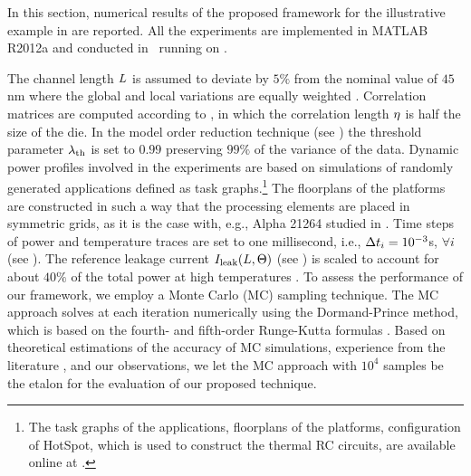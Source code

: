 In this section, numerical results of the proposed framework for the illustrative example in  are reported. All the experiments are implemented in MATLAB R2012a \cite{matlab} and conducted in \hostOS\ running on \hostHardware.

The channel length $L$ is assumed to deviate by $5\%$ from the nominal value of $45$ nm where the global and local variations are equally weighted \cite{juan2011, juan2012}. Correlation matrices are computed according to , in which the correlation length $\eta$ is half the size of the die. In the model order reduction technique (see ) the threshold parameter $\lambda_\text{th}$ is set to $0.99$ preserving $99\%$ of the variance of the data. Dynamic power profiles involved in the experiments are based on simulations of randomly generated applications defined as task graphs.\footnote{The task graphs of the applications, floorplans of the platforms, configuration of HotSpot, which is used to construct the thermal RC circuits, are available online at \cite{sources}.} The floorplans of the platforms are constructed in such a way that the processing elements are placed in symmetric grids, as it is the case with, e.g., Alpha 21264 studied in \cite{juan2011}. Time steps of power and temperature traces are set to one millisecond, i.e., $\Delta t_i = 10^{-3}$s, $\forall i$ (see ). The reference leakage current $I_{\text{leak}}(L, \Theta)$ (see ) is scaled to account for about $40\%$ of the total power at high temperatures \cite{liu2007}. To assess the performance of our framework, we employ a Monte Carlo (MC) sampling technique. The MC approach solves  at each iteration numerically using the Dormand-Prince method, which is based on the fourth- and fifth-order Runge-Kutta formulas \cite{press2007}. Based on theoretical estimations \cite{diaz-emparanza2002} of the accuracy of MC simulations, experience from the literature \cite{xiu2010, eldred2009, maitre2010, shen2009}, and our observations, we let the MC approach with $10^4$ samples be the etalon for the evaluation of our proposed technique.

